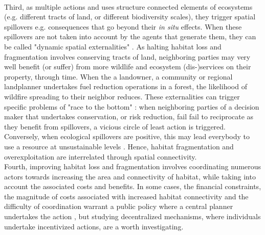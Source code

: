\\
Third, as multiple actions and uses structure connected elements of ecosystems (e.g. different tracts of land, or different biodiversity scales), they trigger spatial spillovers e.g. consequences that go beyond their \textit{in situ} effects. When these spillovers are not taken into account by the agents that generate them, they can be called "dynamic spatial externalities" \citep{sanchirico_bioeconomics_1999, costello_optimal_2008, costello_private_2017}. As halting habitat loss and fragmentation involves conserving tracts of land, neighboring parties may very well benefit (or suffer) from more wildlife and ecosystem (dis-)services on their property, through time. When the a landowner, a community or regional landplanner undertakes fuel reduction operations in a forest, the likelihood of wildfire spreading to their neighbor reduces. These externalities can trigger specific problems of "race to the bottom" \citep{costello_private_2017} : when neighboring parties of a decision maker that undertakes conservation, or risk reduction, fail fail to reciprocate as they benefit from spillovers, a vicious circle of least action is triggered. Conversely, when ecological spillovers are positive, this may lead everybody to use a resource at unsustainable levels \citep{costello_optimal_2008}. Hence, habitat fragmentation and overexploitation are interrelated through spatial connectivity. 
\\
Fourth, improving habitat loss and fragmentation involves coordinating numerous actors towards increasing the area and connectivity of habitat, while taking into account the associated costs and benefits. In some cases, the financial constraints, the magnitude of costs associated with increased habitat connectivity and the difficulty of coordination warrant a public policy where a central planner undertakes the action \citep{Mouysset2012}, but studying decentralized mechanisms, where individuals undertake incentivized actions, are a worth investigating. 
	 
	 
